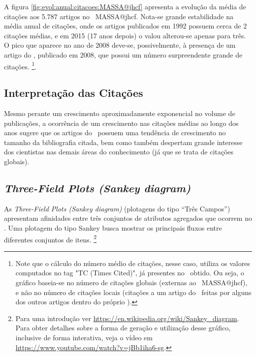 A figura \ref{fig:evol:anual:citacoes:MASSA@jhcf} apresenta a evolução da média de citações aos 5.787 artigos no \dataset\   MASSA@jhcf. 
Nota-se grande estabilidade na média anual de citações, onde os artigos publicados em 1992 possuem cerca de 2 citações médias, e em 2015 (17 anos depois) o valou alterou-se apenas para três. O pico que aparece no ano de 2008 deve-se, possivelmente, à presença de um artigo do \dataset, publicado em 2008, que possui um número surpreendente grande de citações. \footnote{Note que o cálculo do número  médio de citações, nesse caso, utiliza os valores computados no tag "TC (Times Cited)", já presentes no \dataset\   obtido. Ou seja, o gráfico baseia-se no número de citações globais (externas ao \dataset\   MASSA@jhcf), e não no número de citações locais (citações a um artigo do \dataset\   feitas por alguns dos outros artigos dentro do próprio \dataset).}.

\subsection{Interpretação das Citações}
Mesmo perante um crescimento aproximadamente exponencial no volume de publicações, a ocorrência de um crescimento nas citações médias ao longo dos anos sugere que os artigos do \dataset\   possuem uma tendência de crescimento no tamanho da bibliografia citada, bem como também despertam grande interesse dos cientistas nas demais áreas do conhecimento (já que se trata de citações globais).

\subsection{\textit{Three-Field Plots (Sankey diagram)} \label{MASSA:Sankey}}

As \textit{Three-Field Plots (Sankey diagram)} (plotagens do tipo ``Três Campos'') apresentam afinidades entre três conjuntos de atributos agregados que ocorrem no \dataset. Uma plotagem do tipo Sankey busca mostrar os principais fluxos entre diferentes conjuntos de itens. \footnote{Para uma introdução ver \url{https://en.wikipedia.org/wiki/Sankey_diagram}. Para obter detalhes sobre a forma de geração e utilização desse gráfico, inclusive de forma interativa, veja o vídeo em \url{https://www.youtube.com/watch?v=jBb1iha6-sg}.} 

